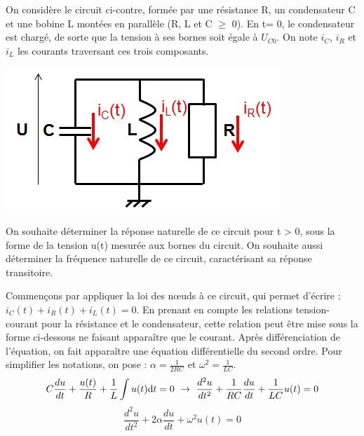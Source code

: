 	\begin{minipage}[l]{0.7\linewidth}
		On considère le circuit ci-contre, formée par une résistance R, un condensateur C et une bobine L montées en parallèle (R, L et C $\geq$ 0). En t= 0, le condensateur est chargé, de sorte que la tension à ses bornes soit égale à $U_{C0}$. On note $i_{C}$, $i_{R}$ et $i_{L}$ les courants traversant ces trois composants. 	
	\end{minipage} \hfill
	\begin{minipage}[r]{0.4\linewidth}
		\includegraphics[scale=0.5]{images/circuit_RLC_reponse_naturelle.jpg} 	
	\end{minipage}
	\vspace{0.5\baselineskip}
	On souhaite déterminer la réponse naturelle de ce circuit pour t > 0, sous la forme de la tension u(t) mesurée aux bornes du circuit. On souhaite aussi déterminer la fréquence naturelle de ce circuit, caractérisant sa réponse transitoire.

	\vspace{1\baselineskip}
	Commençons par appliquer la loi des nœuds à ce circuit, qui permet d'écrire : $i_{C}(t)+i_{R}(t)+i_{L}(t)=0.$ En prenant en compte les relations tension-courant pour la résistance et le condensateur, cette relation peut être mise sous la forme ci-dessous ne faisant apparaître que le courant. Après différenciation de l'équation, on fait apparaître une équation différentielle du second ordre. Pour simplifier les notations, on pose : $\alpha = \frac{1}{2RC} $ et $\omega^{2} = \frac{1}{LC}$.
	\begin{equation*}
	C\frac{du}{dt}+\frac{u(t)}{R}+\frac{1}{L}\int u(t) \mathrm{d} t=0~\rightarrow ~\frac{d^{2}u}{dt^{2}}+\frac{1}{RC}\frac{du}{dt}+\frac{1}{LC}u(t) = 0
	\end{equation*}
	\begin{equation*}
	\frac{d^{2}u}{dt^{2}}+2\alpha \frac{du}{dt}+\omega^{2}u(t) = 0
	\end{equation*}
	
